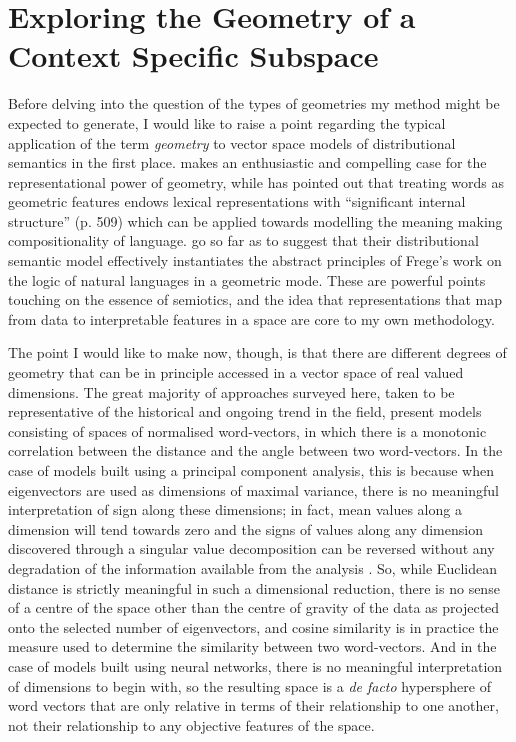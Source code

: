 \section{Exploring the Geometry of a Context Specific Subspace}
Before delving into the question of the types of geometries my method might be expected to generate, I would like to raise a point regarding the typical application of the term \emph{geometry} to vector space models of distributional semantics in the first place.  \cite{Widdows2004} makes an enthusiastic and compelling case for the representational power of geometry, while \cite{Clark2015} has pointed out that treating words as geometric features endows lexical representations with ``significant internal structure'' (p. 509) which can be applied towards modelling the meaning making compositionality of language.  \cite{BaroniEA2014b} go so far as to suggest that their distributional semantic model effectively instantiates the abstract principles of Frege's work on the logic of natural languages \citep{Dummett1981} in a geometric mode.  These are powerful points touching on the essence of semiotics, and the idea that representations that map from data to interpretable features in a space are core to my own methodology.

The point I would like to make now, though, is that there are different degrees of geometry that can be in principle accessed in a vector space of real valued dimensions.  The great majority of approaches surveyed here, taken to be representative of the historical and ongoing trend in the field, present models consisting of spaces of normalised word-vectors, in which there is a monotonic correlation between the distance and the angle between two word-vectors.  In the case of models built using a principal component analysis, this is because when eigenvectors are used as dimensions of maximal variance, there is no meaningful interpretation of sign along these dimensions; in fact, mean values along a dimension will tend towards zero and the signs of values along any dimension discovered through a singular value decomposition can be reversed without any degradation of the information available from the analysis \citep{AbdiEA2010}.  So, while Euclidean distance is strictly meaningful in such a dimensional reduction, there is no sense of a centre of the space other than the centre of gravity of the data as projected onto the selected number of eigenvectors, and cosine similarity is in practice the measure used to determine the similarity between two word-vectors.  And in the case of models built using neural networks, there is no meaningful interpretation of dimensions to begin with, so the resulting space is a \emph{de facto} hypersphere of word vectors that are only relative in terms of their relationship to one another, not their relationship to any objective features of the space.

